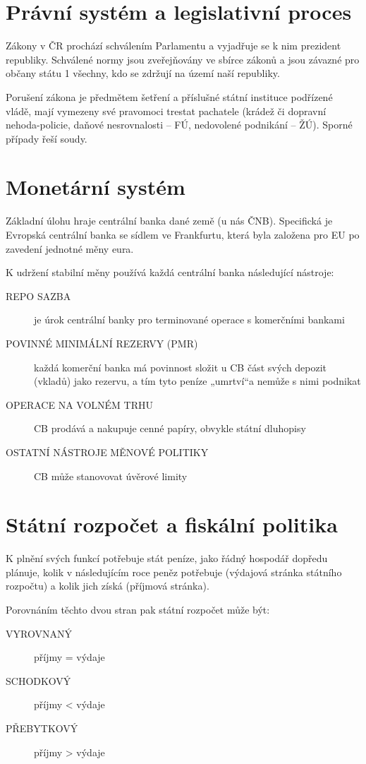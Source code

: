 \section*{Právní systém a legislativní proces}

Zákony v ČR prochází schválením Parlamentu a vyjadřuje se k nim prezident republiky. Schválené normy jsou zveřejňovány ve sbírce zákonů a jsou závazné pro občany státu 1
všechny, kdo se zdržují na území naší republiky.

Porušení zákona je předmětem šetření a příslušné státní instituce podřízené vládě, mají vymezeny své pravomoci trestat pachatele (krádež či dopravní nehoda-policie, daňové nesrovnalosti -- FÚ, nedovolené podnikání -- ŽÚ). Sporné případy řeší soudy.

\section*{Monetární systém}

Základní úlohu hraje centrální banka dané země (u nás ČNB). Specifická je Evropská centrální banka se sídlem ve Frankfurtu, která byla založena pro EU po zavedení jednotné měny eura.

K udržení stabilní měny používá každá centrální banka následující nástroje:
\begin{description}
    \item[REPO SAZBA] je úrok centrální banky pro terminované operace s komerčními bankami
    \item[POVINNÉ MINIMÁLNÍ REZERVY (PMR)] každá komerční banka má povinnost složit u CB část svých depozit (vkladů) jako rezervu, a tím tyto peníze „umrtví“a nemůže s nimi podnikat
    \item[OPERACE NA VOLNÉM TRHU] CB prodává a nakupuje cenné papíry, obvykle státní dluhopisy
    \item[OSTATNÍ NÁSTROJE MĚNOVÉ POLITIKY] CB může stanovovat úvěrové limity
\end{description}

\section*{Státní rozpočet a fiskální politika}

K plnění svých funkcí potřebuje stát peníze, jako řádný hospodář dopředu plánuje, kolik v následujícím roce peněz potřebuje (výdajová stránka státního rozpočtu) a kolik jich získá (příjmová stránka).

Porovnáním těchto dvou stran pak státní rozpočet může být:
\begin{description}
    \item [VYROVNANÝ] příjmy = výdaje   
    \item [SCHODKOVÝ] příjmy < výdaje
    \item [PŘEBYTKOVÝ] příjmy > výdaje
\end{description}

